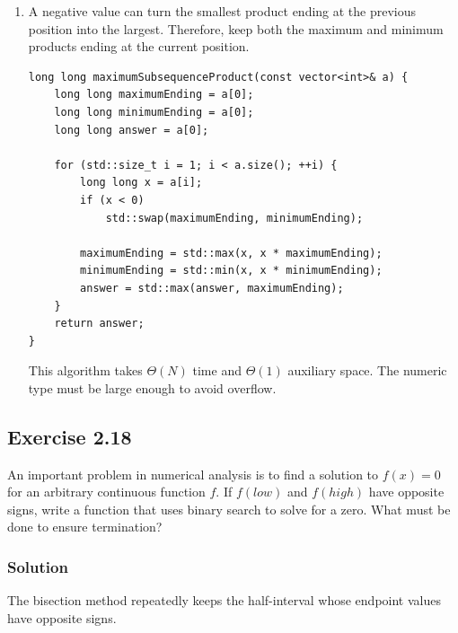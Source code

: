 \documentclass[12pt,a4paper]{article}
\begin{document}
\begin{enumerate}
  Each ordered-set operation takes $O(\log N)$ time, so the total is
  $\boxed{O(N\log N)}$ time and $O(N)$ space.

  \item A negative value can turn the smallest product ending at the
  previous position into the largest. Therefore, keep both the maximum
  and minimum products ending at the current position.

\begin{lstlisting}
long long maximumSubsequenceProduct(const vector<int>& a) {
    long long maximumEnding = a[0];
    long long minimumEnding = a[0];
    long long answer = a[0];

    for (std::size_t i = 1; i < a.size(); ++i) {
        long long x = a[i];
        if (x < 0)
            std::swap(maximumEnding, minimumEnding);

        maximumEnding = std::max(x, x * maximumEnding);
        minimumEnding = std::min(x, x * minimumEnding);
        answer = std::max(answer, maximumEnding);
    }
    return answer;
}
\end{lstlisting}

  This algorithm takes $\boxed{\Theta(N)}$ time and $\Theta(1)$
  auxiliary space. The numeric type must be large enough to avoid
  overflow.
\end{enumerate}

\subsection*{\color{sectionnavy}Exercise 2.18}

\noindent
An important problem in numerical analysis is to find a solution to
$f(x)=0$ for an arbitrary continuous function $f$. If $f(\mathit{low})$
and $f(\mathit{high})$ have opposite signs, write a function that uses
binary search to solve for a zero. What must be done to ensure
termination?

\subsubsection*{\color{sectionnavy}Solution}

The bisection method repeatedly keeps the half-interval whose endpoint
values have opposite signs.
\end{document}
